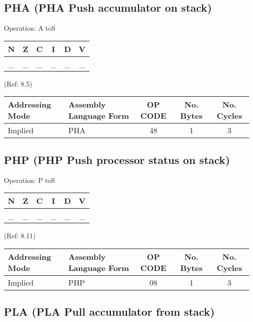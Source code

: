 \documentclass{article}
\begin{document}
  \subsection{PHA (PHA Push accumulator on stack)}

  Operation:  A toS
  \begin{table}[H]
  \centering
  \begin{tabular}{|c c c c c c|}
  \hline
  N&Z&C&I&D&V\\
  \hline
  \_ & \_ & \_ & \_ & \_ & \_\\
  \hline
  \end{tabular}
  \end{table}
                                 (Ref: 8.5)
  \begin{table}[H]
  \centering
  \begin{tabular}{|l|l|c|c|c|}
  \hline
   Addressing Mode& Assembly Language Form& OP CODE &No. Bytes&No. Cycles\\
  \hline
    Implied       &   PHA                 &    48   &    1    &    3     \\
  \hline
  \end{tabular}
  \end{table}

  \subsection{PHP (PHP Push processor status on stack)}

  Operation:  P toS
  \begin{table}[H]
  \centering
  \begin{tabular}{|c c c c c c|}
  \hline
  N&Z&C&I&D&V\\
  \hline
  \_ & \_ & \_ & \_ & \_ & \_\\
  \hline
  \end{tabular}
  \end{table}
                                 (Ref: 8.11)
  \begin{table}[H]
  \centering
  \begin{tabular}{|l|l|c|c|c|}
  \hline
   Addressing Mode& Assembly Language Form& OP CODE &No. Bytes&No. Cycles\\
  \hline
    Implied       &   PHP                 &    08   &    1    &    3     \\
  \hline
  \end{tabular}
  \end{table}


  \subsection{PLA (PLA Pull accumulator from stack)}
\end{document}
